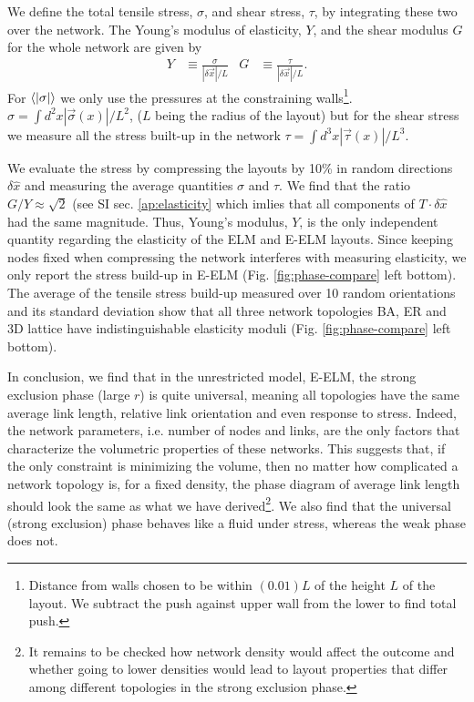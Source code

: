 \documentclass[nofootinbib,preprint,floatfix,endfloats]{revtex4} %
\begin{document}
{We define the total tensile stress, $\sigma$, and shear stress, $\tau$, by integrating these two over the network. %
The Young's modulus of elasticity, $Y$, and the shear modulus $G$ for the whole network  are given by 
\begin{align}
    Y &\equiv \frac{\sigma}{ |\delta \vec{x}|/L} &
    G &\equiv \frac{\tau}{ |\delta \vec{x}|/L} 
    \label{eq:YG}.
\end{align}
For $\be{|\sigma|}$ we only use the pressures at the constraining walls\footnote{Distance from walls chosen to be within $(0.01) L$ of the height $L$ of the layout. 
We subtract the push against upper wall from the lower to find total push. }.  
$\sigma = \int d^2x |\vec{\sigma}(x)|/L^2 $, ($L$ being the radius of the layout) but for the shear stress we measure all the stress built-up in the network $\tau = \int d^3 x |\vec{\tau}(x)| /L^3$. 

We evaluate the stress by compressing the layouts by 10\% in random directions $\delta \hat{x}$ and measuring the average quantities $\sigma$ and $\tau$. We find that the ratio $G/Y \approx \sqrt{2}$ (see SI sec. \ref{ap:elasticity} which imlies that all components of $T\cdot \delta\hat{x}$ had the same magnitude. 
Thus, Young's modulus, $Y$, is the only independent quantity regarding the elasticity of the ELM and E-ELM layouts. 
Since keeping nodes fixed when compressing the network interferes with measuring elasticity, we only report the stress build-up in E-ELM (Fig. \ref{fig:phase-compare} left bottom). 
The average of the tensile stress build-up measured over 10 random orientations and its standard deviation show that all three  network topologies BA, ER and 3D lattice have indistinguishable elasticity moduli (Fig. \ref{fig:phase-compare} left bottom). } %


In conclusion, we find that in the unrestricted model, E-ELM, the strong exclusion phase (large $r$) is quite universal, meaning all topologies have the same average link length, relative link orientation and even response to stress. 
Indeed, the network parameters, i.e. number of nodes and links, are the only factors that characterize the volumetric properties of these networks. 
This suggests that, if the only constraint is minimizing the volume, then no matter how complicated a network topology is, for a fixed density, the phase diagram of average link length should look the same as what we have derived\footnote{
It remains to be checked how network density would affect the outcome and whether going to lower densities would lead to layout properties that differ among different topologies in the strong exclusion phase.}.
We also find that the universal (strong exclusion) phase behaves like a fluid under stress, whereas the weak phase does not.   
\end{document}
